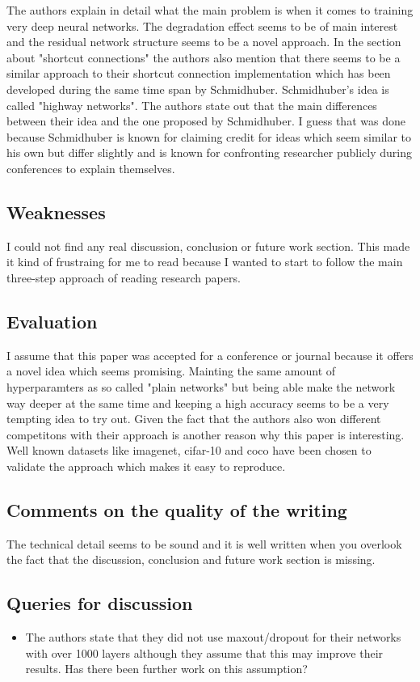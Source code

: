 \documentclass[a4paper]{article}
\begin{document}
The authors explain in detail what the main problem is when it comes to training very deep neural networks. The degradation effect seems to be of main interest and the residual network structure seems to be a novel approach. In the section about "shortcut connections" the authors also mention that there seems to be a similar approach to their shortcut connection implementation which has been developed during the same time span by Schmidhuber. Schmidhuber's idea is called "highway networks". The authors state out that the main differences between their idea and the one proposed by Schmidhuber. I guess that was done because Schmidhuber is known for claiming credit for ideas which seem similar to his own but differ slightly and is known for confronting researcher publicly during conferences to explain themselves.

\subsection{Weaknesses}

I could not find any real discussion, conclusion or future work section. This made it kind of frustraing for me to read because I wanted to start to follow the main three-step approach of reading research papers. 

\subsection{Evaluation}

I assume that this paper was accepted for a conference or journal because it offers a novel idea which seems promising. Mainting the same amount of hyperparamters as so called "plain networks" but being able make the network way deeper at the same time and keeping a high accuracy seems to be a very tempting idea to try out. Given the fact that the authors also won different competitons with their approach is another reason why this paper is interesting. Well known datasets like imagenet, cifar-10 and coco have been chosen to validate the approach which makes it easy to reproduce.

\subsection{Comments on the quality of the writing}

The technical detail seems to be sound and it is well written when you overlook the fact that the discussion, conclusion and future work section is missing.

\subsection{Queries for discussion}

\begin{itemize}
	\item The authors state that they did not use maxout/dropout for their networks with over 1000 layers although they assume that this may improve their results. Has there been further work on this assumption?%
\end{itemize}
\end{document}
